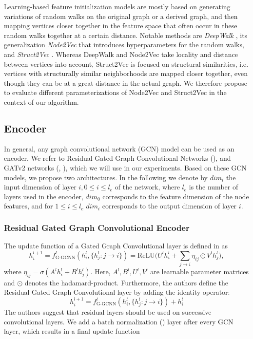 \documentclass[draft,final]{vutinfth} %
\begin{document}
Learning-based feature initialization models are mostly based on generating variations of random walks on the original graph or a derived graph, and then mapping vertices closer together in the feature space that often occur in these random walks together at a certain distance. Notable methods are \emph{DeepWalk} \cite{Perozzi2014}, its generalization \emph{Node2Vec} \cite{GroverL16} that introduces hyperparameters for the random walks, and \emph{Struct2Vec} \cite{FigueiredoRS17}. Whereas DeepWalk and Node2Vec take locality and distance between vertices into account, Struct2Vec is focused on structural similarities, i.e. vertices with structurally similar neighborhoods are mapped closer together, even though they can be at a great distance in the actual graph. We therefore propose to evaluate different parameterizations of Node2Vec and Struct2Vec in the context of our algorithm. 

\subsection{Encoder}
In general, any graph convolutional network (GCN) model can be used as an encoder. We refer to Residual Gated Graph Convolutional Networks (\cite{Bresson2017}), and GATv2 networks (\cite{Velickovic2018}, \cite{Brody2021}), which we will use in our experiments. Based on these GCN models, we propose two architectures. In the following we denote by $dim_i$ the input dimension of layer $i, 0 \leq i \leq l_e$ of the network, where $l_e$ is the number of layers used in the encoder, $dim_0$ corresponds to the feature dimension of the node features, and for $1 \leq i \leq l_e$ $dim_i$ corresponds to the output dimension of layer $i$. 

\subsubsection{Residual Gated Graph Convolutional Encoder}
The update function of a Gated Graph Convolutional layer is defined in \cite{Bresson2017} as 
\[
    h_i^{l+1} = f_{\text{G-GCNN}}^l(h_i^l, \{ h_j^l \colon j \rightarrow i \}) = \text{ReLU} \Big( U^l h_i^l + \sum_{j \rightarrow i} \eta_{ij} \odot V^l h^l_j \Big),
\]
where $\eta_{ij} = \sigma(A^l h_i^l + B^l h_j^l)$. Here, $A^l, B^l, U^l, V^l$ are learnable parameter matrices and $\odot$ denotes the hadamard-product. 
Furthermore, the authors define the Residual Gated Graph Convolutional layer by adding the identity operator: 
\[
    h_i^{l+1} = f_{\text{G-GCNN}}^l(h_i^l, \{ h_j^l \colon j \rightarrow i \}) + h_i^l
\]
The authors suggest that residual layers should be used on successive convolutional layers. 
We add a batch normalization (\cite{IoffeS15}) layer after every GCN layer, which results in a final update function 
\end{document}
